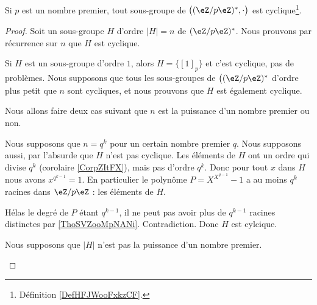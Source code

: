 \begin{proposition}       \label{PROPooKSCRooPyInSv}
	Si \( p\) est un nombre premier, tout sous-groupe de \( \big( (\eZ/p\eZ)^*, \cdot\big)\) est cyclique\footnote{Définition \ref{DefHFJWooFxkzCF}.}.
\end{proposition}

\begin{proof}
	Soit un sous-groupe \( H\) d'ordre \( | H |=n\) de \(   (\eZ/p\eZ)^*\). Nous prouvons par récurrence sur \( n\) que \( H\) est cyclique.

	\begin{subproof}
		\spitem[\( n=1\)]
		Si \( H\) est un sous-groupe d'ordre \( 1\), alors \( H=\{ [1]_p \}\) et c'est cyclique, pas de problèmes.
		\spitem[Récurrence]
		Nous supposons que tous les sous-groupes de \( \big( (\eZ/p\eZ)^*\) d'ordre plus petit que \( n\) sont cycliques, et nous prouvons que \( H\) est également cyclique.

		Nous allons faire deux cas suivant que \( n\) est la puissance d'un nombre premier ou non.

		\begin{subproof}
			\spitem[Si \( n=q^k\)]
			Nous supposons que \( n=q^k\) pour un certain nombre premier \( q\). Nous supposons aussi, par l'absurde que \( H\) n'est pas cyclique. Les éléments de \( H\) ont un ordre qui divise \( q^k\) (corolaire \ref{CorpZItFX}), mais pas d'ordre \( q^k\). Donc pour tout \( x\) dans \( H\) nous avons \( x^{q^{k-1}}=1\). En particulier le polynôme \( P=X^{X^{q-1}}-1\) a au moins \( q^k\) racines dans \( \eZ/p\eZ\) : les éléments de \( H\).

			Hélas le degré de \( P\) étant \( q^{k-1}\), il ne peut pas avoir plus de \( q^{k-1}\) racines distinctes par \ref{ThoSVZooMpNANi}. Contradiction. Donc \( H\) est cylcique.


			Nous supposons que \( | H |\) n'est pas la puissance d'un nombre premier.


\end{subproof}
\end{subproof}
\end{proof}
